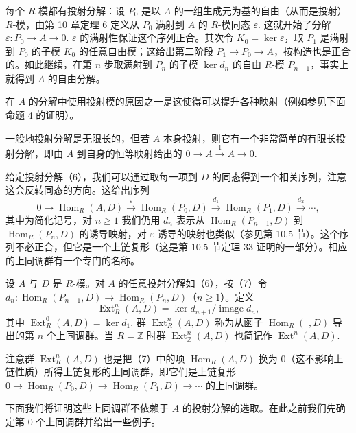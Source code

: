 每个 \(R\)-模都有投射分解：设 \(P_0\) 是以 \(A\) 的一组生成元为基的自由（从而是投射）\(R\)-模，由第 10 章定理 6 定义从 \(P_0\) 满射到 \(A\) 的 \(R\)-模同态 \(\varepsilon\). 这就开始了分解 \(\varepsilon : P_0 \to A \to 0\). \(\varepsilon\) 的满射性保证这个序列正合。其次令 \(K_0 = \ker\varepsilon\)，取 \(P_1\) 是满射到 \(P_0\) 的子模 \(K_0\) 的任意自由模；这给出第二阶段 \(P_1 \to P_0 \to A\)，按构造也是正合的。如此继续，在第 \(n\) 步取满射到 \(P_n\) 的子模 \(\ker d_n\) 的自由 \(R\)-模 \(P_{n+1}\)，事实上就得到 \(A\) 的自由分解。

在 \(A\) 的分解中使用投射模的原因之一是这使得可以提升各种映射（例如参见下面命题 4 的证明）。

一般地投射分解是无限长的，但若 \(A\) 本身投射，则它有一个非常简单的有限长投射分解，即由 \(A\) 到自身的恒等映射给出的 \(0 \to A \xrightarrow{1} A \to 0\).

给定投射分解（6），我们可以通过取每一项到 \(D\) 的同态得到一个相关序列，注意这会反转同态的方向。这给出序列
\[
0 \to \operatorname{Hom}_R(A, D) \xrightarrow{\varepsilon} \operatorname{Hom}_R(P_0, D) \xrightarrow{d_1} \operatorname{Hom}_R(P_1, D) \xrightarrow{d_2} \cdots, \tag{17.7}
\]
其中为简化记号，对 \(n \geq 1\) 我们仍用 \(d_n\) 表示从 \(\operatorname{Hom}_R(P_{n-1}, D)\) 到 \(\operatorname{Hom}_R(P_n, D)\) 的诱导映射，对 \(\varepsilon\) 诱导的映射也类似（参见第 10.5 节）。这个序列不必正合，但它是一个上链复形（这是第 10.5 节定理 33 证明的一部分）。相应的上同调群有一个专门的名称。

\begin{definition}
设 \(A\) 与 \(D\) 是 \(R\)-模。对 \(A\) 的任意投射分解如（6），按（7）令 \(d_n : \operatorname{Hom}_R(P_{n-1}, D) \to \operatorname{Hom}_R(P_n, D)\)（\(n \geq 1\)）。定义
\[
\operatorname{Ext}_R^n(A, D) = \ker d_{n+1}/\operatorname{image}d_n,
\]
其中 \(\operatorname{Ext}_R^0(A, D) = \ker d_1\). 群 \(\operatorname{Ext}_R^n(A, D)\) 称为从函子 \(\operatorname{Hom}_R(\_, D)\) 导出的第 \(n\) 个上同调群。当 \(R = \mathbb{Z}\) 时群 \(\operatorname{Ext}_{\mathbb{Z}}^n(A, D)\) 也简记作 \(\operatorname{Ext}^n(A, D)\).
\end{definition}

注意群 \(\operatorname{Ext}_R^n(A, D)\) 也是把（7）中的项 \(\operatorname{Hom}_R(A, D)\) 换为 0（这不影响上链性质）所得上链复形的上同调群，即它们是上链复形 \(0 \to \operatorname{Hom}_R(P_0, D) \to \operatorname{Hom}_R(P_1, D) \to \cdots\) 的上同调群。

下面我们将证明这些上同调群不依赖于 \(A\) 的投射分解的选取。在此之前我们先确定第 0 个上同调群并给出一些例子。

